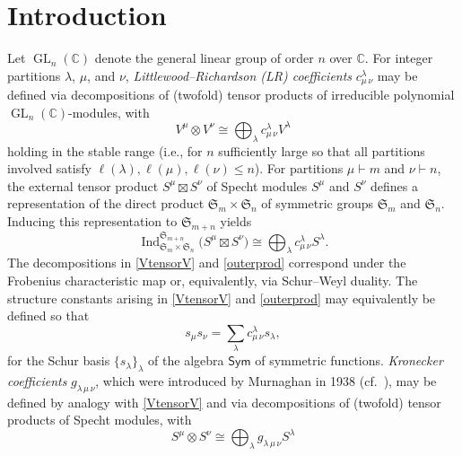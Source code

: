\documentclass[12pt]{article}
\begin{document}
\section{Introduction}
 Let $\operatorname{GL}_{n}(\mathbb{C})$ denote the general linear group
 of order $n$ over $\mathbb{C}$. For integer partitions $\lambda$, $\mu$, 
 and $\nu$, \emph{Littlewood--Richardson (LR) coefficients} $c_{\mu \, \nu}^{\lambda}$ may be 
 defined via decompositions of (twofold) tensor products of irreducible polynomial $\operatorname{GL}_n(\mathbb{C})$-modules, with 
\begin{equation}\label{VtensorV}
 V^{\mu} \otimes V^{\nu} \cong \bigoplus_{\lambda} c_{\mu \, \nu}^{\lambda} V^{\lambda} 
\end{equation}
 holding in the stable range (i.e., for $n$ sufficiently large so that all partitions involved satisfy $\ell(\lambda), \ell(\mu), \ell(\nu) \le n$). 
 For partitions $\mu \vdash m$ and $\nu \vdash n$, the external tensor product $S^{\mu} \boxtimes S^{\nu}$ of Specht 
 modules $S^{\mu}$ and $S^{\nu}$ defines a representation of the direct product
 $\mathfrak{S}_m \times \mathfrak{S}_n$ of symmetric groups $\mathfrak{S}_{m}$ and $\mathfrak{S}_{n}$. 
 Inducing this representation to $\mathfrak{S}_{m+n}$ yields 
\begin{equation}\label{outerprod}
 \operatorname{Ind}_{\mathfrak{S}_{m} \times \mathfrak{S}_{n}}^{\mathfrak{S}_{m+n}}\big( S^{\mu} \boxtimes S^{\nu} \big) \cong \bigoplus_{\lambda } c_{\mu \, \nu}^{\lambda} S^{\lambda}.
\end{equation}
 The decompositions in \eqref{VtensorV} and \eqref{outerprod} correspond under the Frobenius characteristic map or, equivalently, via 
 Schur--Weyl duality. The structure constants arising in \eqref{VtensorV} and \eqref{outerprod} may equivalently be defined so that 
\begin{equation}\label{ssprod}
 s_{\mu} s_{\nu} = \sum_{\lambda} c_{\mu \, \nu}^{\lambda} s_{\lambda}, 
\end{equation}
 for the Schur basis $\{ s_{\lambda} \}_{\lambda}$ of the algebra $\textsf{Sym}$ of symmetric functions. \emph{Kronecker coefficients} 
 $g_{\lambda \, \mu \, \nu}$, which were introduced by Murnaghan in 1938 \cite{Murnaghan1938} (cf.\ \cite{Murnaghan1956}), 
 may be defined by analogy with \eqref{VtensorV} and via decompositions of (twofold) tensor products of Specht modules, with 
\begin{equation}\label{SpechtSpecht}
 S^{\mu} \otimes S^{\nu} \cong \bigoplus_{\lambda} g_{\lambda \, \mu \, \nu} S^{\lambda} 
\end{equation}
\end{document}
